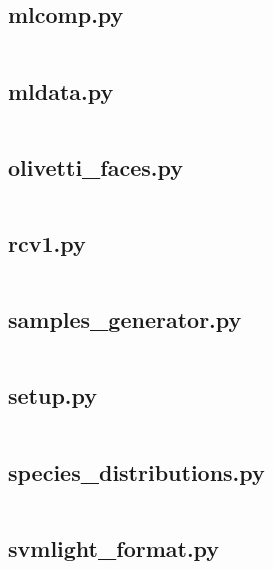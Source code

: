 \documentclass{article}
\begin{document}
\subsection{mlcomp.py}
\inputminted{python}{/home/dufferzafar/dev/@clones/scikit-learn/sklearn/datasets/mlcomp.py}
\newpage

\subsection{mldata.py}
\inputminted{python}{/home/dufferzafar/dev/@clones/scikit-learn/sklearn/datasets/mldata.py}
\newpage

\subsection{olivetti\_faces.py}
\inputminted{python}{/home/dufferzafar/dev/@clones/scikit-learn/sklearn/datasets/olivetti_faces.py}
\newpage

\subsection{rcv1.py}
\inputminted{python}{/home/dufferzafar/dev/@clones/scikit-learn/sklearn/datasets/rcv1.py}
\newpage

\subsection{samples\_generator.py}
\inputminted{python}{/home/dufferzafar/dev/@clones/scikit-learn/sklearn/datasets/samples_generator.py}
\newpage

\subsection{setup.py}
\inputminted{python}{/home/dufferzafar/dev/@clones/scikit-learn/sklearn/datasets/setup.py}
\newpage

\subsection{species\_distributions.py}
\inputminted{python}{/home/dufferzafar/dev/@clones/scikit-learn/sklearn/datasets/species_distributions.py}
\newpage

\subsection{svmlight\_format.py}
\inputminted{python}{/home/dufferzafar/dev/@clones/scikit-learn/sklearn/datasets/svmlight_format.py}
\newpage
\end{document}
